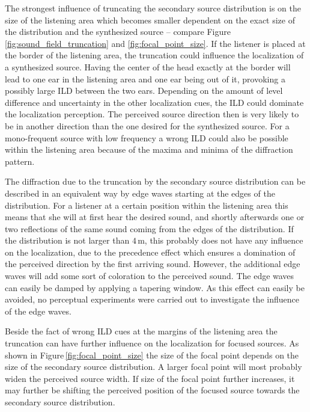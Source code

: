 The strongest influence of truncating the secondary source distribution is on the
size of the listening area which becomes smaller dependent on the exact size of
the distribution and the synthesized source -- compare
Figure\,\ref{fig:sound_field_truncation} and \ref{fig:focal_point_size}.
If the listener is placed at the
border
of the listening area, the truncation could influence the localization of a
synthesized source. Having the center of the head exactly at the border will
lead to one ear in the listening area and one ear being out of it, provoking a
possibly large \ac{ILD} between the two ears. Depending on the amount of level
difference and uncertainty in the other localization cues, the \ac{ILD} could
dominate the localization perception. The perceived source direction then is
very likely to be in another direction than the one desired for the synthesized source.
For a mono-frequent source with low frequency a wrong \ac{ILD} could also be
possible within the listening area because of the maxima and minima of the
diffraction pattern.

The diffraction due to the truncation by the secondary source distribution can
be described in an equivalent way by edge waves starting at the edges of the
distribution. For a listener at a certain position within the
listening area this means that she will at first hear the desired sound, and shortly afterwards
one or two reflections of the same sound coming from the edges of the
distribution. If the distribution is not larger than $4$\,m, this probably does not have
any influence on the localization, due to the precedence
effect\autocite[A good summary is provided in][]{Litovsky1999} which
ensures a domination of the perceived direction by the first arriving sound.
However, the additional edge waves will add some sort of coloration to the perceived
sound.
The edge waves can easily be damped by applying a tapering window.
As this effect can easily be avoided, no perceptual experiments were carried out to
investigate the influence of the edge waves.

Beside the fact of wrong \ac{ILD} cues at the margins of the listening area the
truncation can have further influence on the localization for focused
sources. As shown in Figure\,\ref{fig:focal_point_size} the size of the focal
point depends on the size of the secondary source distribution. A larger focal
point will most probably widen the perceived source width. If size of the focal
point further increases, it may further be shifting the perceived position of the
focused source towards the secondary source distribution.

